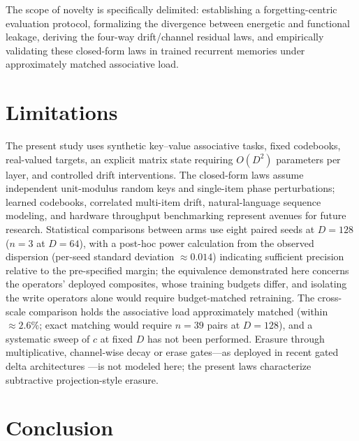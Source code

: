 \documentclass[11pt,a4paper]{article}
\begin{document}
The scope of novelty is specifically delimited: establishing a forgetting-centric evaluation protocol, formalizing the divergence between energetic and functional leakage, deriving the four-way drift/channel residual laws, and empirically validating these closed-form laws in trained recurrent memories under approximately matched associative load.

\section{Limitations}\label{sec:limits}

The present study uses synthetic key--value associative tasks, fixed codebooks, real-valued targets, an explicit matrix state requiring $O(D^2)$ parameters per layer, and controlled drift interventions. The closed-form laws assume independent unit-modulus random keys and single-item phase perturbations; learned codebooks, correlated multi-item drift, natural-language sequence modeling, and hardware throughput benchmarking represent avenues for future research. Statistical comparisons between arms use eight paired seeds at $D=128$ ($n=3$ at $D=64$), with a post-hoc power calculation from the observed dispersion (per-seed standard deviation $\approx 0.014$) indicating sufficient precision relative to the pre-specified margin; the equivalence demonstrated here concerns the operators' deployed composites, whose training budgets differ, and isolating the write operators alone would require budget-matched retraining. The cross-scale comparison holds the associative load approximately matched (within $\approx 2.6\%$; exact matching would require $n=39$ pairs at $D=128$), and a systematic sweep of $c$ at fixed $D$ has not been performed. Erasure through multiplicative, channel-wise decay or erase gates---as deployed in recent gated delta architectures \citep{yang2025gateddelta,hatamizadeh2026gateddeltanet2}---is not modeled here; the present laws characterize subtractive projection-style erasure.

\section{Conclusion}\label{sec:conclusion}
\end{document}
